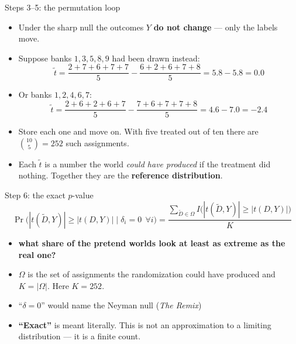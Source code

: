 \documentclass[
  11pt,
  ignorenonframetext,
  aspectratio=169,
]{beamer}
\providecommand{\tightlist}{%
  \setlength{\itemsep}{0pt}\setlength{\parskip}{0pt}}
\begin{document}
\begin{frame}{Steps 3--5: the permutation loop}
\protect{}\label{steps-35-the-permutation-loop}
\begin{itemize}
\tightlist
\item
  Under the sharp null the outcomes \(Y\) \textbf{do not change} ---
  only the labels move.
\item
  Suppose banks \(1, 3, 5, 8, 9\) had been drawn instead: \[
  \tilde t = \frac{2+7+6+7+7}{5} - \frac{6+2+6+7+8}{5} = 5.8 - 5.8 = 0.0
  \]
\item
  Or banks \(1, 2, 4, 6, 7\): \[
  \tilde t = \frac{2+6+2+6+7}{5} - \frac{7+6+7+7+8}{5} = 4.6 - 7.0 = -2.4
  \]
\item
  Store each one and move on. With five treated out of ten there are
  \(\binom{10}{5} = 252\) such assignments.
\item
  Each \(\tilde t\) is a number the world \emph{could have produced} if
  the treatment did nothing. Together they are the \textbf{reference
  distribution}.
\end{itemize}
\end{frame}

\begin{frame}{Step 6: the exact \(p\)-value}
\protect{}\label{step-6-the-exact-p-value}
\[
\Pr\big(|t(\tilde D, Y)| \geq |t(D, Y)| \;\big|\; \delta_i = 0 \;\, \forall i\big) = \frac{\sum_{\tilde D \in \Omega} I\big(|t(\tilde D, Y)| \geq |t(D, Y)|\big)}{K}
\]

\begin{itemize}
\tightlist
\item
  \textbf{what share of the pretend worlds look at least as extreme as
  the real one?}
\item
  \(\Omega\) is the set of assignments the randomization could have
  produced and \(K = |\Omega|\). Here \(K = 252\).
\item
  ``\(\delta = 0\)'' would name the Neyman null (\emph{The Remix})
\item
  \textbf{``Exact''} is meant literally. This is not an approximation to
  a limiting distribution --- it is a finite count.
\end{itemize}
\end{frame}
\end{document}
